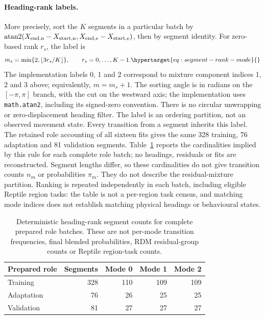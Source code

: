 \paragraph{Heading-rank labels.}
More precisely, sort the \(K\) segments in a particular batch by
\(\operatorname{atan2}(X_{\rm end,n}-X_{\rm start,n},
X_{\rm end,e}-X_{\rm start,e})\), then by segment identity. For zero-based
rank \(r_s\), the label is
\begin{equation}
 m_s=\min\{2,\lfloor 3r_s/K\rfloor\},\qquad r_s=0,\ldots,K-1.
 \label{eq:segment-rank-mode}\hypertarget{eq:segment-rank-mode}{}
\end{equation}
The implementation labels 0, 1 and 2 correspond to mixture component
indices 1, 2 and 3 above; equivalently, \(m=m_s+1\).
The sorting angle is in radians on the \([-\pi,\pi]\) branch, with the
cut on the westward axis; the implementation uses \texttt{math.atan2},
including its signed-zero convention. There is no circular unwrapping or
zero-displacement heading filter. The label is an ordering partition,
not an observed movement state.
Every transition from a segment inherits this label. The retained role
accounting of all sixteen fits gives the same 328 training, 76 adaptation
and 81 validation segments. Table~\ref{tab:mode-rank-cardinality} reports
the cardinalities implied by this rule for each complete role batch;
no headings, residuals or fits are reconstructed. Segment lengths differ,
so these cardinalities do not give transition counts \(n_m\) or probabilities
\(\pi_m\). They do not describe the residual-mixture partition. Ranking is
repeated independently in each batch, including eligible Reptile region
tasks: the table is not a per-region task census, and matching mode indices
does not establish matching physical headings or behavioural states.

\begin{table}[htbp]
\centering\small
\caption{Deterministic heading-rank segment counts for complete prepared
role batches. These are not per-mode transition frequencies, final blended
probabilities, RDM residual-group counts or Reptile region-task counts.}
\label{tab:mode-rank-cardinality}\hypertarget{tab:mode-rank-cardinality}{}
\begin{tabular}{lrrrr}
\toprule
Prepared role & Segments & Mode 0 & Mode 1 & Mode 2\\
\midrule
Training & 328 & 110 & 109 & 109\\
Adaptation & 76 & 26 & 25 & 25\\
Validation & 81 & 27 & 27 & 27\\
\bottomrule
\end{tabular}
\end{table}


